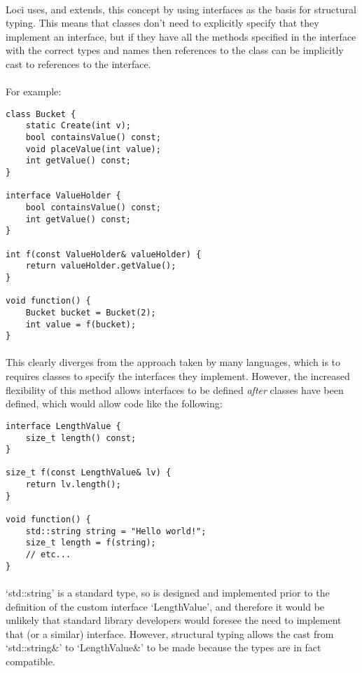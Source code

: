 \documentclass[12pt,twoside,notitlepage]{report}
\begin{document}
\paragraph{}
Loci uses, and extends, this concept by using interfaces as the basis for structural typing. This means that classes don't need to explicitly specify that they implement an interface, but if they have all the methods specified in the interface with the correct types and names then references to the class can be implicitly cast to references to the interface.

\paragraph{}
For example:


\begin{lstlisting}
class Bucket {
	static Create(int v);
	bool containsValue() const;
	void placeValue(int value);
	int getValue() const;
}

interface ValueHolder {
	bool containsValue() const;
	int getValue() const;
}

int f(const ValueHolder& valueHolder) {
	return valueHolder.getValue();
}

void function() {
	Bucket bucket = Bucket(2);
	int value = f(bucket);
}
\end{lstlisting}


\paragraph{}
This clearly diverges from the approach taken by many languages, which is to requires classes to specify the interfaces they implement. However, the increased flexibility of this method allows interfaces to be defined \emph{after} classes have been defined, which would allow code like the following:


\begin{lstlisting}
interface LengthValue {
	size_t length() const;
}

size_t f(const LengthValue& lv) {
	return lv.length();
}

void function() {
	std::string string = "Hello world!";
	size_t length = f(string);
	// etc...
}
\end{lstlisting}


\paragraph{}
`std::string' is a standard type, so is designed and implemented prior to the definition of the custom interface `LengthValue', and therefore it would be unlikely that standard library developers would foresee the need to implement that (or a similar) interface. However, structural typing allows the cast from `std::string\&' to `LengthValue\&' to be made because the types are in fact compatible.
\end{document}
